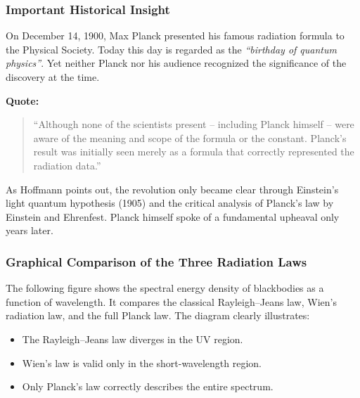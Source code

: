 \subsubsection{Important Historical Insight}
\vspace{1em}
\begin{tcolorbox}[didaktikbox,title=Important Historical Insight {\cite{Hoffmann2008}}]
	\label{box:geschichte-planck}
	On December 14, 1900, Max Planck presented his famous radiation formula to the Physical Society. Today this day is regarded as the \textit{“birthday of quantum physics”}. Yet neither Planck nor his audience recognized the significance of the discovery at the time.
	
	\medskip
	\textbf{Quote:} 
	\begin{quote}
		“Although none of the scientists present – including Planck himself – were aware of the meaning and scope of the formula or the constant. Planck’s result was initially seen merely as a formula that correctly represented the radiation data.”
	\end{quote}
	
	As Hoffmann points out, the revolution only became clear through Einstein’s light quantum hypothesis (1905) and the critical analysis of Planck’s law by Einstein and Ehrenfest. Planck himself spoke of a fundamental upheaval only years later.
\end{tcolorbox}
\newpage
\noindent
\subsubsection{Graphical Comparison of the Three Radiation Laws}

The following figure shows the spectral energy density of blackbodies as a function of wavelength. It compares the classical Rayleigh–Jeans law, Wien’s radiation law, and the full Planck law. The diagram clearly illustrates:

\begin{itemize}
	\item The Rayleigh–Jeans law diverges in the UV region.
	\item Wien’s law is valid only in the short-wavelength region.
	\item Only Planck’s law correctly describes the entire spectrum.
\end{itemize}

